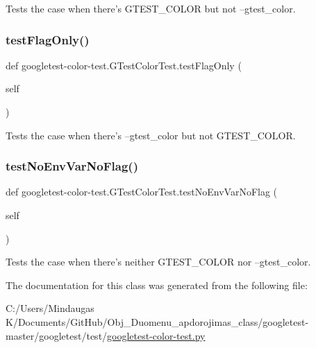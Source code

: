 \begin{DoxyVerb}Tests the case when there's GTEST_COLOR but not --gtest_color.\end{DoxyVerb}
 \mbox{\label{classgoogletest-color-test_1_1_g_test_color_test_ade41e99b5486c9d947d9b817210174f6}} 
\subsubsection{\texorpdfstring{testFlagOnly()}{testFlagOnly()}}
{\footnotesize\ttfamily def googletest-\/color-\/test.\+G\+Test\+Color\+Test.\+test\+Flag\+Only (\begin{DoxyParamCaption}\item[{}]{self }\end{DoxyParamCaption})}

\begin{DoxyVerb}Tests the case when there's --gtest_color but not GTEST_COLOR.\end{DoxyVerb}
 \mbox{\label{classgoogletest-color-test_1_1_g_test_color_test_ae36014618c6afc19fa6d77babf8faa88}} 
\subsubsection{\texorpdfstring{testNoEnvVarNoFlag()}{testNoEnvVarNoFlag()}}
{\footnotesize\ttfamily def googletest-\/color-\/test.\+G\+Test\+Color\+Test.\+test\+No\+Env\+Var\+No\+Flag (\begin{DoxyParamCaption}\item[{}]{self }\end{DoxyParamCaption})}

\begin{DoxyVerb}Tests the case when there's neither GTEST_COLOR nor --gtest_color.\end{DoxyVerb}
 

The documentation for this class was generated from the following file\+:\begin{DoxyCompactItemize}
\item 
C\+:/\+Users/\+Mindaugas K/\+Documents/\+Git\+Hub/\+Obj\+\_\+\+Duomenu\+\_\+apdorojimas\+\_\+class/googletest-\/master/googletest/test/\mbox{\hyperlink{googletest-master_2googletest_2test_2googletest-color-test_8py}{googletest-\/color-\/test.\+py}}\end{DoxyCompactItemize}
